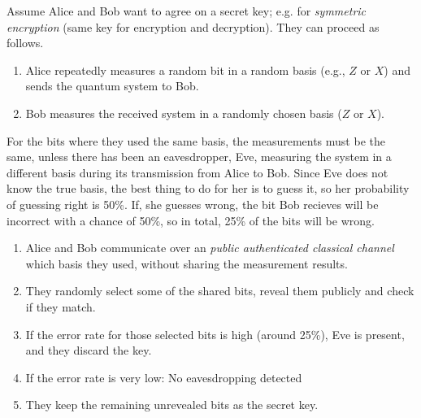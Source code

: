 Assume Alice and Bob want to agree on a secret key; e.g. for \emph{symmetric encryption} (same key for encryption and decryption).
They can proceed as follows.
\begin{enumerate}
  \item Alice repeatedly measures a random bit in a random basis (e.g., $Z$ or $X$) and sends the quantum system to Bob.
  \item Bob measures the received system in a randomly chosen basis ($Z$ or $X$).
\end{enumerate}
  For the bits where they used the same basis, the measurements must be the same, unless there has been an eavesdropper, Eve, measuring the system in a different basis during its transmission from Alice to Bob. 
  Since Eve does not know the true basis, the best thing to do for her is to guess it, so her probability of guessing right is 50\%.
  If, she guesses wrong, the bit Bob recieves will be incorrect with a chance of 50\%, so in total, 25\% of the bits will be wrong.
\begin{enumerate}[resume]
  \item Alice and Bob communicate over an \emph{public authenticated classical channel} which basis they used, without sharing the measurement results.
  \item They randomly select some of the shared bits, reveal them publicly and check if they match.
  \item If the error rate for those selected bits is high (around 25\%), Eve is present, and they discard the key.
  \item If the error rate is very low: No eavesdropping detected
  \item They keep the remaining unrevealed bits as the secret key.
\end{enumerate}






